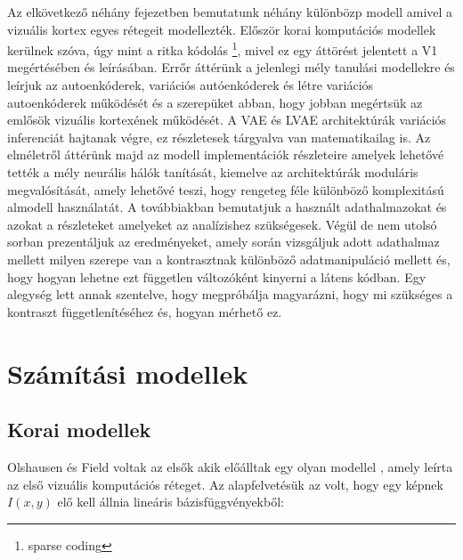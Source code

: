 \documentclass[12pt, english]{article}
\begin{document}
\vspace{7mm}

\par Az elkövetkező néhány fejezetben bemutatunk néhány különbözp modell amivel a vizuális kortex egyes rétegeit modellezték. Először korai komputációs modellek kerülnek szóva, úgy mint a ritka kódolás \footnote{sparse coding}, mivel ez egy áttörést jelentett a V1 megértésében és leírásában. Errőr áttérünk a jelenlegi mély tanulási modellekre és leírjuk az autoenkóderek, variációs autóenkóderek és létre variációs autoenkóderek működését és a szerepüket abban, hogy jobban megértsük az emlősök vizuális kortexének működését. A VAE és LVAE architektúrák variációs inferenciát hajtanak végre, ez részletesek tárgyalva van matematikailag is. Az elméletről áttérünk majd az modell implementációk részleteire amelyek lehetővé tették a mély neurális hálók tanítását, kiemelve az architektúrák moduláris megvalósítását, amely lehetővé teszi, hogy rengeteg féle különböző komplexitású almodell használatát. A továbbiakban bemutatjuk a használt adathalmazokat és azokat a részleteket amelyeket az analízishez szükségesek. Végül de nem utolsó sorban prezentáljuk az eredményeket, amely során vizsgáljuk adott adathalmaz mellett milyen szerepe van a kontrasztnak különböző adatmanipuláció mellett és, hogy hogyan lehetne ezt független változóként kinyerni a látens kódban. Egy alegység lett annak szentelve, hogy megpróbálja magyarázni, hogy mi szükséges a kontraszt függetlenítéséhez és, hogyan mérhető ez.

\newpage

\section{Számítási modellek}

\vspace{7mm}

\subsection{Korai modellek}

\vspace{5mm}

\par Olshausen és Field voltak az elsők akik előálltak egy olyan modellel \cite{olshausen1996emergence}, amely leírta az első vizuális komputációs réteget. Az alapfelvetésük az volt, hogy egy képnek $I(x, y)$ elő kell állnia lineáris bázisfüggvényekből:
\end{document}

